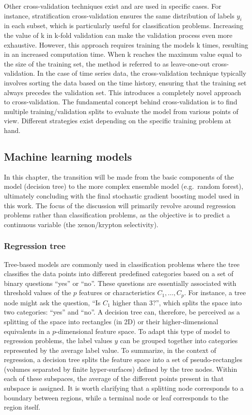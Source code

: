 \documentclass[main]{subfiles}
\begin{document}
Other cross-validation techniques exist and are used in specific cases. For instance, stratification cross-validation ensures the same distribution of labels $y_i$ in each subset, which is particularly useful for classification problems. Increasing the value of k in  k-fold validation can make the validation process even more exhaustive. However, this approach requires training the models k times, resulting in an increased computation time. When k reaches the maximum value equal to the size of the training set, the method is referred to as leave-one-out cross-validation. In the case of time series data, the cross-validation technique typically involves sorting the data based on the time history, ensuring that the training set always precedes the validation set. This introduces a completely novel approach to cross-validation. The fundamental concept behind cross-validation is to find multiple training/validation splits to evaluate the model from various points of view. Different strategies exist depending on the specific training problem at hand.

\subsection{Machine learning models}\label{sct:model}

In this chapter, the transition will be made from the basic components of the model (decision tree) to the more complex ensemble model (e.g.\ random forest), ultimately concluding with the final stochastic gradient boosting model used in this work. The focus of the discussion will primarily revolve around regression problems rather than classification problems, as the objective is to predict a continuous variable (the xenon/krypton selectivity).

\subsubsection{Regression tree}

Tree-based models are commonly used in classification problems where the tree classifies the data points into different predefined categories based on a set of binary questions ``yes'' or ``no''. These questions are essentially associated with threshold values of the $p$ features or characteristics $C_1,\ldots,C_p$. For instance, a tree node might ask the question, ``Is $C_1$ higher than $3$?'', which splits the space into two categories: ``yes'' and ``no''. A decision tree can, therefore, be perceived as a splitting of the space into rectangles (in 2D) or their higher-dimensional equivalents in a $p$-dimensional feature space. To adapt this type of model to regression problems, the label values $y$ can be grouped together into categories represented by the average label value. To summarize, in the context of regression, a decision tree splits the feature space into a set of pseudo-rectangles (volumes separated by finite hyper-surfaces) defined by the tree nodes. Within each of these subspaces, the average of the different points present in that subspace is assigned. It is worth clarifying that a splitting node corresponds to a boundary between regions, while a terminal node or leaf corresponds to the region itself.
\end{document}
